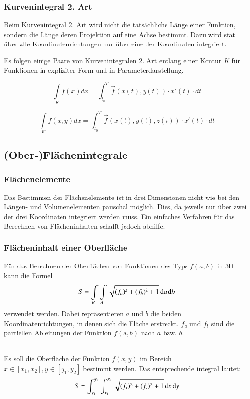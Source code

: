 \subsubsection{Kurvenintegral 2. Art}
Beim Kurvenintegral 2. Art wird nicht die tatsächliche Länge einer Funktion, sondern die Länge deren Projektion auf eine Achse bestimmt.
Dazu wird stat über alle Koordinatenrichtungen nur über eine der Koordinaten integriert.

Es folgen einige Paare von Kurvenintegralen 2. Art entlang einer Kontur $K$ für Funktionen in expliziter Form und in Parameterdarstellung.

\[
    \int\limits_{K}f(x)dx = \int_{t_0}^{T}\vec{f}(x(t), y(t)) \cdot x'(t) \cdot dt
\]

\[
    \int\limits_{K}f(x, y)dx = \int_{t_0}^{T}\vec{f}(x(t), y(t), z(t)) \cdot x'(t) \cdot dt
\]


\subsection{(Ober-)Flächenintegrale}
\subsubsection{Flächenelemente}
Das Bestimmen der Flächenelemente ist in drei Dimensionen nicht wie bei den Längen- und Volumenelementen pauschal möglich.
Dies, da jeweils nur über zwei der drei Koordinaten integriert werden muss.
Ein einfaches Verfahren für das Berechnen von Flächeninhalten schafft jedoch abhilfe.
\subsubsection{Flächeninhalt einer Oberfläche}
Für das Berechnen der Oberflächen von Funktionen des Typs $f(a, b)$ in 3D kann die Formel
$$ S = \int\limits_{B} \int\limits_{A} \sqrt{(f_{a})^2 + (f_{b})^2 + 1} \mathop{} \! \mathrm{d} a \mathop{} \! \mathrm{d} b $$
verwendet werden. Dabei repräsentieren $a$ und $b$ die beiden Koordinatenrichtungen, in denen sich die Fläche erstreckt.
$f_a$ und $f_b$ sind die partiellen Ableitungen der Funktion $f(a, b)$ nach $a$ bzw. $b$.
\medskip

\\
Es soll die Oberfläche der Funktion $ f(x, y) $ im Bereich $ x \in [x_1, x_2], y \in [y_1, y_2] $ bestimmt werden.
Das entsprechende integral lautet:
$$ S = \int_{y_1}^{y_2} \int_{x_1}^{x_2} \sqrt{(f_{x})^2 + (f_{y})^2 + 1} \mathop{} \! \mathrm{d} x \mathop{} \! \mathrm{d} y $$

